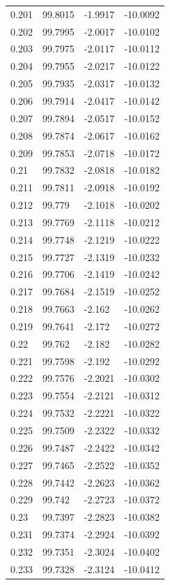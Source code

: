 \begin{tabular}{llll}
0.201 & 99.8015 & -1.9917 & -10.0092 \\
0.202 & 99.7995 & -2.0017 & -10.0102 \\
0.203 & 99.7975 & -2.0117 & -10.0112 \\
0.204 & 99.7955 & -2.0217 & -10.0122 \\
0.205 & 99.7935 & -2.0317 & -10.0132 \\
0.206 & 99.7914 & -2.0417 & -10.0142 \\
0.207 & 99.7894 & -2.0517 & -10.0152 \\
0.208 & 99.7874 & -2.0617 & -10.0162 \\
0.209 & 99.7853 & -2.0718 & -10.0172 \\
0.21 & 99.7832 & -2.0818 & -10.0182 \\
0.211 & 99.7811 & -2.0918 & -10.0192 \\
0.212 & 99.779 & -2.1018 & -10.0202 \\
0.213 & 99.7769 & -2.1118 & -10.0212 \\
0.214 & 99.7748 & -2.1219 & -10.0222 \\
0.215 & 99.7727 & -2.1319 & -10.0232 \\
0.216 & 99.7706 & -2.1419 & -10.0242 \\
0.217 & 99.7684 & -2.1519 & -10.0252 \\
0.218 & 99.7663 & -2.162 & -10.0262 \\
0.219 & 99.7641 & -2.172 & -10.0272 \\
0.22 & 99.762 & -2.182 & -10.0282 \\
0.221 & 99.7598 & -2.192 & -10.0292 \\
0.222 & 99.7576 & -2.2021 & -10.0302 \\
0.223 & 99.7554 & -2.2121 & -10.0312 \\
0.224 & 99.7532 & -2.2221 & -10.0322 \\
0.225 & 99.7509 & -2.2322 & -10.0332 \\
0.226 & 99.7487 & -2.2422 & -10.0342 \\
0.227 & 99.7465 & -2.2522 & -10.0352 \\
0.228 & 99.7442 & -2.2623 & -10.0362 \\
0.229 & 99.742 & -2.2723 & -10.0372 \\
0.23 & 99.7397 & -2.2823 & -10.0382 \\
0.231 & 99.7374 & -2.2924 & -10.0392 \\
0.232 & 99.7351 & -2.3024 & -10.0402 \\
0.233 & 99.7328 & -2.3124 & -10.0412 \\

\end{tabular}
